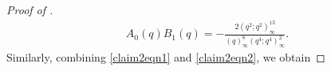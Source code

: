 \documentclass[12pt,reqno]{amsart}
\renewcommand{\(}{\left\(}
\renewcommand{\)}{\right\)}
\numberwithin{equation}{section}
\theoremstyle{plain}
\theoremstyle{definition}
\numberwithin{equation}{section}
\begin{document}
\begin{proof}[Proof of ]
 \begin{align*}
 A_0(q)B_1(q)%
 =-\frac{2\left(q^{2};q^2\right)^{13}_{\infty}}{\left(q\right)^8_{\infty} \left(q^{4};q^{4}\right)^2_{\infty}}.%
 \end{align*}
Similarly, combining \eqref{claim2eqn1} and \eqref{claim2eqn2}, we obtain 

\end{proof}
\end{document}
